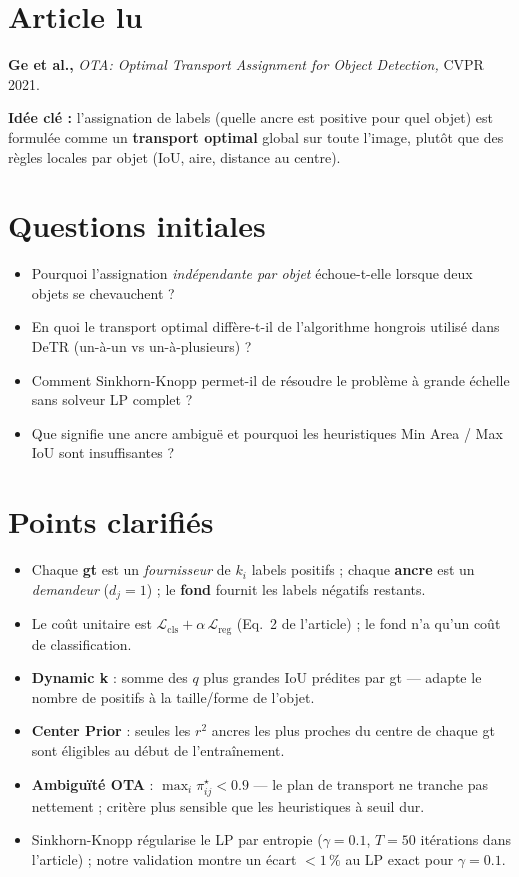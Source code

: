 \documentclass[a4paper,11pt]{article}
\begin{document}

\thispagestyle{empty}
\clearpage

\section*{Article lu}

\textbf{Ge et al.,} \emph{OTA: Optimal Transport Assignment for Object Detection,} CVPR 2021.

\textbf{Idée clé :} l'assignation de labels (quelle ancre est positive pour quel objet) est formulée comme un \textbf{transport optimal} global sur toute l'image, plutôt que des règles locales par objet (IoU, aire, distance au centre).

\section*{Questions initiales}

\begin{itemize}[leftmargin=*]
  \item Pourquoi l'assignation \emph{indépendante par objet} échoue-t-elle lorsque deux objets se chevauchent ?
  \item En quoi le transport optimal diffère-t-il de l'algorithme hongrois utilisé dans DeTR (un-à-un vs un-à-plusieurs) ?
  \item Comment Sinkhorn-Knopp permet-il de résoudre le problème à grande échelle sans solveur LP complet ?
  \item Que signifie une ancre \og ambiguë\fg{} et pourquoi les heuristiques Min Area / Max IoU sont insuffisantes ?
\end{itemize}

\section*{Points clarifiés}

\begin{itemize}[leftmargin=*]
  \item Chaque \textbf{gt} est un \emph{fournisseur} de $k_i$ labels positifs ; chaque \textbf{ancre} est un \emph{demandeur} ($d_j=1$) ; le \textbf{fond} fournit les labels négatifs restants.
  \item Le coût unitaire est $\mathcal{L}_{\text{cls}} + \alpha\,\mathcal{L}_{\text{reg}}$ (Eq.~2 de l'article) ; le fond n'a qu'un coût de classification.
  \item \textbf{Dynamic k} : somme des $q$ plus grandes IoU prédites par gt --- adapte le nombre de positifs à la taille/forme de l'objet.
  \item \textbf{Center Prior} : seules les $r^2$ ancres les plus proches du centre de chaque gt sont éligibles au début de l'entraînement.
  \item \textbf{Ambiguïté OTA} : $\max_i \pi^\star_{ij} < 0.9$ --- le plan de transport ne tranche pas nettement ; critère plus sensible que les heuristiques à seuil dur.
  \item Sinkhorn-Knopp régularise le LP par entropie ($\gamma=0.1$, $T=50$ itérations dans l'article) ; notre validation montre un écart $<1\,\%$ au LP exact pour $\gamma=0.1$.
\end{itemize}
\end{document}
